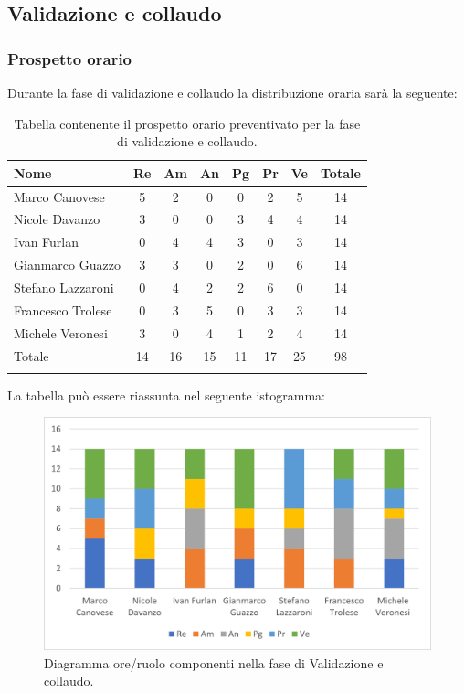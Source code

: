 			\subsection{Validazione e collaudo}
            \subsubsection{Prospetto orario}
			Durante la fase di validazione e collaudo la distribuzione oraria sarà la seguente:
			
			\begin{longtable}{|l|c|c|c|c|c|c|c|}
				\hline
				\rowcolor{lighter-grayer}
				\textbf{Nome} & \textbf{Re} & \textbf{Am} & \textbf{An} & \textbf{Pg}  & \textbf{Pr}   & \textbf{Ve} & \textbf{Totale} \\
				\hline
				\endfirsthead
				
				\hline
				Marco Canovese & 5 & 2 & 0 & 0 & 2 & 5 & 14\\
				\hline
				\hline
				Nicole Davanzo & 3 & 0 & 0 & 3 & 4 & 4 & 14\\
				\hline
				\hline
				Ivan Furlan & 0 & 4 & 4 & 3 & 0 & 3 & 14\\
				\hline
				\hline
				Gianmarco Guazzo & 3 & 3 & 0 & 2 & 0 & 6 & 14\\
				\hline
				\hline
				Stefano Lazzaroni & 0 & 4 & 2 & 2 & 6 & 0 & 14\\
				\hline
				\hline
				Francesco Trolese & 0 & 3 & 5 & 0 & 3 & 3 & 14\\
				\hline
				\hline
				Michele Veronesi & 3 & 0 & 4 & 1 & 2 & 4 & 14\\
				\hline 
				\hline
				Totale & 14 & 16 & 15 & 11 & 17 & 25 & 98\\
				\hline 
				\rowcolor{white}
				\caption{Tabella contenente il prospetto orario preventivato per la fase di validazione e collaudo.}
			\end{longtable}

		
			La tabella può essere riassunta nel seguente istogramma:
		
			\begin{figure}[H]
				\centering
				\includegraphics[width=0.8\linewidth]{res/images/preventivo/7-1.png}
				\caption{Diagramma ore/ruolo componenti nella fase di Validazione e collaudo.}
				\label{fig:diagramma suddivisione ruoli fase Validazione e collaudo.}
			\end{figure}
		

